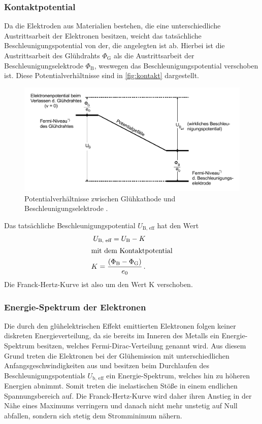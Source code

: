 \subsubsection{Kontaktpotential}

Da die Elektroden aus Materialien bestehen, die eine unterschiedliche Austrittsarbeit der Elektronen besitzen,
weicht das tatsächliche Beschleunigungspotential von der, die angelegten ist ab.
Hierbei ist die Austrittsarbeit des Glühdrahts $\Phi_\text{G}$ als die Austrittsarbeit der Beschleunigungselektrode $\Phi_\text{B}$,
weswegen das Beschleunigungspotential verschoben ist. Diese Potentialverhältnisse sind in \autoref{fig:kontakt} dargestellt.
\begin{figure}
    \centering
    \includegraphics[width=0.8\linewidth]{pictures/kontakt.pdf}
    \caption{Potentialverhältnisse zwischen Glühkathode und Beschleunigungselektrode \cite{v601}.}
    \label{fig:kontakt}
\end{figure}
Das tatsächliche Beschleunigungspotential $U_\text{B, eff}$ hat den Wert
\begin{align}
    U_\text{B, eff} = U_\text{B} - K \\
    \intertext{mit dem Kontaktpotential}
    K = \frac{\left( \Phi_\text{B} - \Phi_\text{G} \right)}{e_0} \label{eq:Kontaktpotential} \, .
\end{align}
Die Franck-Hertz-Kurve ist also um den Wert K verschoben.


\subsubsection{Energie-Spektrum der Elektronen}

Die durch den glühelektrischen Effekt emittierten Elektronen folgen keiner diskreten Energieverteilung,
da sie bereits im Inneren des Metalls ein Energie-Spektrum besitzen, welches Fermi-Dirac-Verteilung genannt wird.
Aus diesem Grund treten die Elektronen bei der Glühemission mit unterschiedlichen Anfangsgeschwindigkeiten aus
und besitzen beim Durchlaufen des Beschleunigungspotentials $U_\text{b, eff}$ ein Energie-Spektrum,
welches hin zu höheren Energien abnimmt.
Somit treten die inelastischen Stöße in einem endlichen Spannungsbereich auf.
Die Franck-Hertz-Kurve wird daher ihren Anstieg in der Nähe eines Maximums verringern 
und danach nicht mehr unstetig auf Null abfallen, sondern sich stetig dem Stromminimum nähern.



